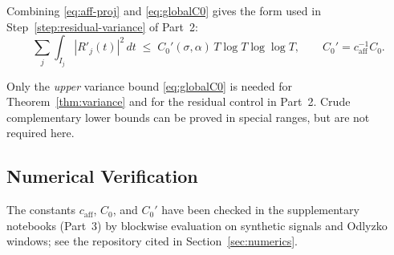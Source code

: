 Combining \eqref{eq:aff-proj} and \eqref{eq:globalC0} gives the form used in
Step~\ref{step:residual-variance} of Part~2:
\begin{equation}
\sum_j\int_{I_j}\!|R'_j(t)|^2\,dt
\;\le\; C_0'(\sigma,\alpha)\, T\log T\log\log T,
\qquad C_0' = c_{\mathrm{aff}}^{-1} C_0.
\label{eq:residC0prime}
\end{equation}

\begin{remark}
Only the \emph{upper} variance bound \eqref{eq:globalC0} is needed for
Theorem~\ref{thm:variance} and for the residual control in Part~2.
Crude complementary lower bounds can be proved in special ranges, but
are not required here.
\end{remark}

\subsection{Numerical Verification}
The constants $c_{\mathrm{aff}}$, $C_0$, and $C_0'$ have been checked in the
supplementary notebooks (Part~3) by blockwise evaluation on synthetic signals
and Odlyzko windows; see the repository cited in Section~\ref{sec:numerics}.
